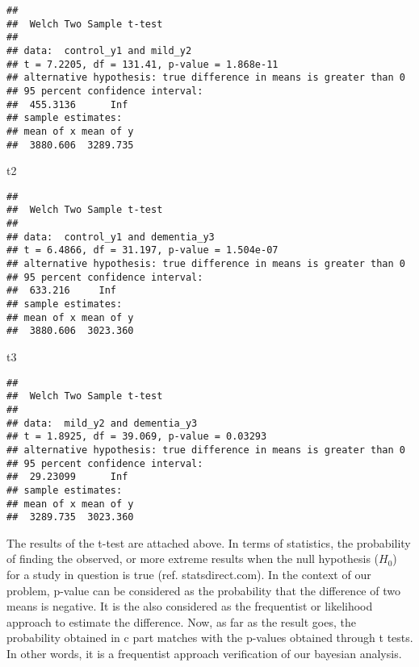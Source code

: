 \documentclass[]{article}
\newenvironment{Shaded}{\begin{snugshade}}{\end{snugshade}}
\newcommand{\NormalTok}[1]{{#1}}
\begin{document}
\begin{verbatim}
## 
##  Welch Two Sample t-test
## 
## data:  control_y1 and mild_y2
## t = 7.2205, df = 131.41, p-value = 1.868e-11
## alternative hypothesis: true difference in means is greater than 0
## 95 percent confidence interval:
##  455.3136      Inf
## sample estimates:
## mean of x mean of y 
##  3880.606  3289.735
\end{verbatim}

\begin{Shaded}
\begin{Highlighting}[]
\NormalTok{t2}
\end{Highlighting}
\end{Shaded}

\begin{verbatim}
## 
##  Welch Two Sample t-test
## 
## data:  control_y1 and dementia_y3
## t = 6.4866, df = 31.197, p-value = 1.504e-07
## alternative hypothesis: true difference in means is greater than 0
## 95 percent confidence interval:
##  633.216     Inf
## sample estimates:
## mean of x mean of y 
##  3880.606  3023.360
\end{verbatim}

\begin{Shaded}
\begin{Highlighting}[]
\NormalTok{t3}
\end{Highlighting}
\end{Shaded}

\begin{verbatim}
## 
##  Welch Two Sample t-test
## 
## data:  mild_y2 and dementia_y3
## t = 1.8925, df = 39.069, p-value = 0.03293
## alternative hypothesis: true difference in means is greater than 0
## 95 percent confidence interval:
##  29.23099      Inf
## sample estimates:
## mean of x mean of y 
##  3289.735  3023.360
\end{verbatim}

The results of the t-test are attached above. In terms of statistics,
the probability of finding the observed, or more extreme results when
the null hypothesis (\(H_0\)) for a study in question is true (ref.
statsdirect.com). In the context of our problem, p-value can be
considered as the probability that the difference of two means is
negative. It is the also considered as the frequentist or likelihood
approach to estimate the difference. Now, as far as the result goes, the
probability obtained in c part matches with the p-values obtained
through t tests. In other words, it is a frequentist approach
verification of our bayesian analysis.
\end{document}

